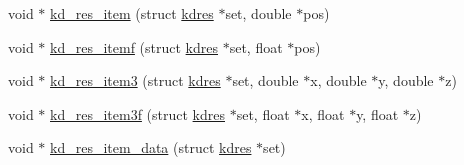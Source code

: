 \begin{DoxyCompactItemize}
\item 
void $\ast$ \hyperlink{a00014_a5b0521aec4d2a2267bbab0f4408ec64a_a5b0521aec4d2a2267bbab0f4408ec64a}{kd\-\_\-res\-\_\-item} (struct \hyperlink{a00010}{kdres} $\ast$set, double $\ast$pos)
\item 
void $\ast$ \hyperlink{a00014_ae2d5802f669e14e245fc8ee6b8a3ff16_ae2d5802f669e14e245fc8ee6b8a3ff16}{kd\-\_\-res\-\_\-itemf} (struct \hyperlink{a00010}{kdres} $\ast$set, float $\ast$pos)
\item 
void $\ast$ \hyperlink{a00014_a68e3356de97626347762c20a1f29b493_a68e3356de97626347762c20a1f29b493}{kd\-\_\-res\-\_\-item3} (struct \hyperlink{a00010}{kdres} $\ast$set, double $\ast$x, double $\ast$y, double $\ast$z)
\item 
void $\ast$ \hyperlink{a00014_a09a99deb44dd60393a72dc91ab936e98_a09a99deb44dd60393a72dc91ab936e98}{kd\-\_\-res\-\_\-item3f} (struct \hyperlink{a00010}{kdres} $\ast$set, float $\ast$x, float $\ast$y, float $\ast$z)
\item 
void $\ast$ \hyperlink{a00014_abbff3a82caa304688020bc050d474d30_abbff3a82caa304688020bc050d474d30}{kd\-\_\-res\-\_\-item\-\_\-data} (struct \hyperlink{a00010}{kdres} $\ast$set)
\end{DoxyCompactItemize}


